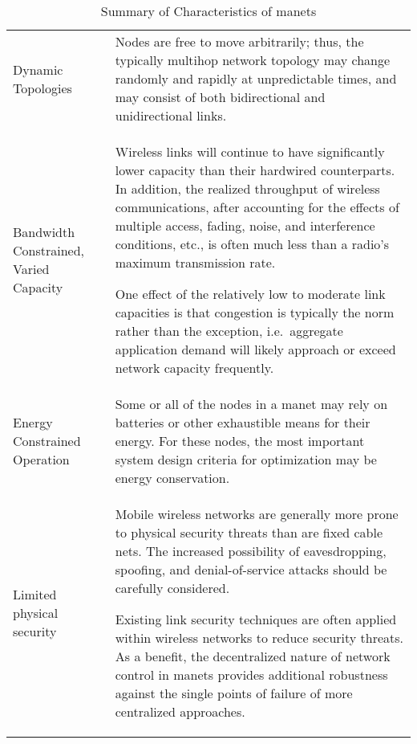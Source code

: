 \begin{table}
  \begin{tabularx}{\textwidth}{p{2cm}X}\toprule
    Dynamic Topologies & Nodes are free to move arbitrarily; thus, the typically multihop network topology may change randomly and rapidly at unpredictable times, and may consist of both bidirectional and unidirectional links.
\\
    Bandwidth Constrained, Varied Capacity & Wireless links will continue to have significantly lower capacity than their hardwired counterparts.
In addition, the realized throughput of wireless communications, after accounting for the effects of multiple access, fading, noise, and interference conditions, etc., is often much less than a radio's maximum transmission rate.
\par
One effect of the relatively low to moderate link capacities is that congestion is typically the norm rather than the exception, i.e.\  aggregate application demand will likely approach or exceed network capacity frequently.\\
    Energy Constrained Operation &  Some or all of the nodes in a \gls{manet} may rely on batteries or other exhaustible means for their energy.
For these nodes, the most important system design criteria for optimization may be energy conservation.\\
    Limited physical security & Mobile wireless networks are generally more prone to physical security threats than are fixed cable nets.
The increased possibility of eavesdropping, spoofing, and denial-of-service attacks should be carefully considered.\par
Existing link security techniques are often applied within wireless networks to reduce security threats.
As a benefit, the decentralized nature of network control in \gls{manet}s provides additional robustness against the single points of failure of more centralized approaches.\\

\end{tabularx}
\caption[Summary of Characteristics of \gls{manet}s]{Summary of Characteristics of \gls{manet}s\cite{Corson1999}}
\label{tab:manet_characteristics}
\end{table}

\ifx\ifthesis\undefined
	
\fi
